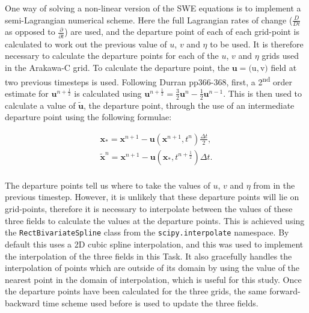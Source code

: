 \documentclass{article}
\newcommand{\ts}{\textsuperscript}
\begin{document}
One way of solving a non-linear version of the SWE equations is to implement a semi-Lagrangian
numerical scheme. Here the full Lagrangian rates of change ($\frac{D}{Dt}$ as opposed to
$\frac{\partial}{\partial t}$) are used, and the departure point of each of each grid-point is
calculated to work out the previous value of $u$, $v$ and $\eta$ to be used. It is therefore
necessary to calculate the departure points for each of the $u$, $v$ and $\eta$ grids used in the
Arakawa-C grid.  To calculate the departure point, the $\boldsymbol{u} =  ($u$, $v$)$ field at two
previous timesteps is used. Following Durran pp366-368, first, a 2\ts{nd} order estimate for
$\boldsymbol{u}^{n + \frac{1}{2}}$ is calculated using $\boldsymbol{u}^{n + \frac{1}{2}} =
\frac{3}{2}  \boldsymbol{u}^{n} - \frac{1}{2} \boldsymbol{u}^{n-1}$. This is then used to calculate
a value of $\tilde{\boldsymbol{u}}$, the departure point, through the use of an intermediate
departure point using the following formulae:

\begin{align}
    \label{eqn:sl_update1} 
    \boldsymbol{x_{*}} = \boldsymbol{x}^{n+1} - \boldsymbol{u}(\boldsymbol{x}^{n+1}, t^n)
    \frac{\Delta t}{2},\\
    \label{eqn:sl_update2} 
    \boldsymbol{\tilde{x}}^n = \boldsymbol{x}^{n+1} - \boldsymbol{u}(\boldsymbol{x_{*}},
    t^{n+\frac{1}{2}}) \Delta t.\\
\end{align}

The departure points tell us where to take the values of $u$, $v$ and $\eta$ from in the previous
timestep. However, it is unlikely that these departure points will lie on grid-points, therefore it
is necessary to interpolate between the values of these three fields to calculate the values at the
departure points. This is achieved using the \lstinline[basicstyle=\ttfamily]|RectBivariateSpline|
class from the \lstinline[basicstyle=\ttfamily]|scipy.interpolate| namespace. By default this uses a
2D cubic spline interpolation, and this was used to implement the interpolation of the three fields
in this Task. It also gracefully handles the interpolation of points which are outside of its domain
by using the value of the nearest point in the domain of interpolation, which is useful for this
study. Once the departure points have been calculated for the three grids, the same forward-backward
time scheme used before is used to update the three fields. 
\end{document}
